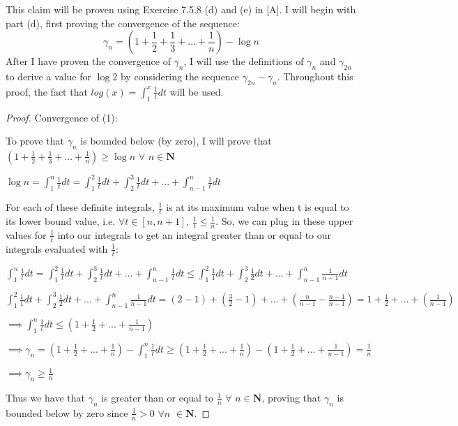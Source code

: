 \documentclass{article}
\begin{document}
This claim will be proven using Exercise 7.5.8 (d) and (e) in [A]. I will begin with part (d), first proving the convergence of the sequence: 
\begin{equation}
    \gamma_n = (1 + \frac{1}{2} + \frac{1}{3} + ... + \frac{1}{n}) - \log{n}
\end{equation}
After I have proven the convergence of $\gamma_n$, I will use the definitions of $\gamma_n$ and $\gamma_{2n}$ to derive a value for $\log{2}$ by considering the sequence $\gamma_{2n} - \gamma_n$. Throughout this proof, the fact that $log(x) = \int_{1}^{x} \frac{1}{t} dt$ will be used. 
\begin{proof} 

Convergence of (1): 

To prove that $\gamma_n$ is bounded below (by zero), I will prove that $(1 + \frac{1}{2} + \frac{1}{3} + ... + \frac{1}{n}) \geq \log{n}$ $\forall$ $n \in \mathbf{N}$

$\log{n} = \int_{1}^{n} \frac{1}{t} dt = \int_{1}^{2} \frac{1}{t} dt + \int_{2}^{3} \frac{1}{t} dt + ... + \int_{n-1}^{n} \frac{1}{t} dt$

For each of these definite integrals, $\frac{1}{t}$ is at its maximum value when t is equal to its lower bound value, i.e. $\forall t \in [n, n+1]$, $\frac{1}{t} \leq \frac{1}{n}$. So, we can plug in these upper values for $\frac{1}{t}$ into our integrals to get an integral greater than or equal to our integrals evaluated with $\frac{1}{t}$:

$\int_{1}^{n} \frac{1}{t} dt = \int_{1}^{2} \frac{1}{t} dt + \int_{2}^{3} \frac{1}{t} dt + ... + \int_{n-1}^{n} \frac{1}{t} dt \leq \int_{1}^{2} \frac{1}{1} dt + \int_{2}^{3} \frac{1}{2} dt + ... + \int_{n-1}^{n} \frac{1}{n-1} dt$

$\int_{1}^{2} \frac{1}{1} dt + \int_{2}^{3} \frac{1}{2} dt + ... + \int_{n-1}^{n} \frac{1}{n-1} dt = (2-1) + (\frac{3}{2} - 1) + ... + (\frac{n}{n-1} - \frac{n-1}{n-1}) = 1 + \frac{1}{2} + ... + (\frac{1}{n-1})$

$\implies \int_{1}^{n} \frac{1}{t} dt \leq (1 + \frac{1}{2} + ... + \frac{1}{n-1})$

$\implies \gamma_n = (1 + \frac{1}{2} + ... + \frac{1}{n}) - \int_{1}^{n} \frac{1}{t} dt \geq (1 + \frac{1}{2} + ... + \frac{1}{n}) - (1 + \frac{1}{2} + ... + \frac{1}{n-1}) = \frac{1}{n}$

$\implies \gamma_n \geq \frac{1}{n}$

Thus we have that $\gamma_n$ is greater than or equal to $\frac{1}{n}$ $\forall$ $n \in \mathbf{N}$, proving that $\gamma_n$ is bounded below by zero since $\frac{1}{n} > 0$ $\forall n$ $\in \mathbf{N}$.



\end{proof}
\end{document}
